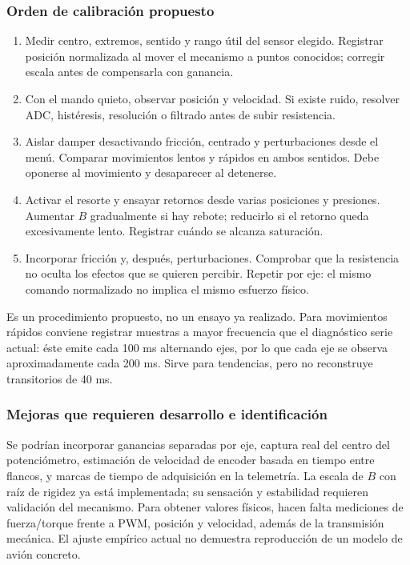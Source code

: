 \documentclass[11pt,a4paper]{article}
\begin{document}
\subsubsection{Orden de calibración propuesto}
\begin{enumerate}
\item Medir centro, extremos, sentido y rango útil del sensor elegido. Registrar posición normalizada al mover el mecanismo a puntos conocidos; corregir escala antes de compensarla con ganancia.
\item Con el mando quieto, observar posición y velocidad. Si existe ruido, resolver ADC, histéresis, resolución o filtrado antes de subir resistencia.
\item Aislar damper desactivando fricción, centrado y perturbaciones desde el menú. Comparar movimientos lentos y rápidos en ambos sentidos. Debe oponerse al movimiento y desaparecer al detenerse.
\item Activar el resorte y ensayar retornos desde varias posiciones y presiones. Aumentar $B$ gradualmente si hay rebote; reducirlo si el retorno queda excesivamente lento. Registrar cuándo se alcanza saturación.
\item Incorporar fricción y, después, perturbaciones. Comprobar que la resistencia no oculta los efectos que se quieren percibir. Repetir por eje: el mismo comando normalizado no implica el mismo esfuerzo físico.
\end{enumerate}
Es un procedimiento propuesto, no un ensayo ya realizado. Para movimientos rápidos conviene registrar muestras a mayor frecuencia que el diagnóstico serie actual: éste emite cada 100 ms alternando ejes, por lo que cada eje se observa aproximadamente cada 200 ms. Sirve para tendencias, pero no reconstruye transitorios de 40 ms.

\subsubsection{Mejoras que requieren desarrollo e identificación}
Se podrían incorporar ganancias separadas por eje, captura real del centro del potenciómetro, estimación de velocidad de encoder basada en tiempo entre flancos, y marcas de tiempo de adquisición en la telemetría. La escala de $B$ con raíz de rigidez ya está implementada; su sensación y estabilidad requieren validación del mecanismo. Para obtener valores físicos, hacen falta mediciones de fuerza/torque frente a PWM, posición y velocidad, además de la transmisión mecánica. El ajuste empírico actual no demuestra reproducción de un modelo de avión concreto.
\end{document}
